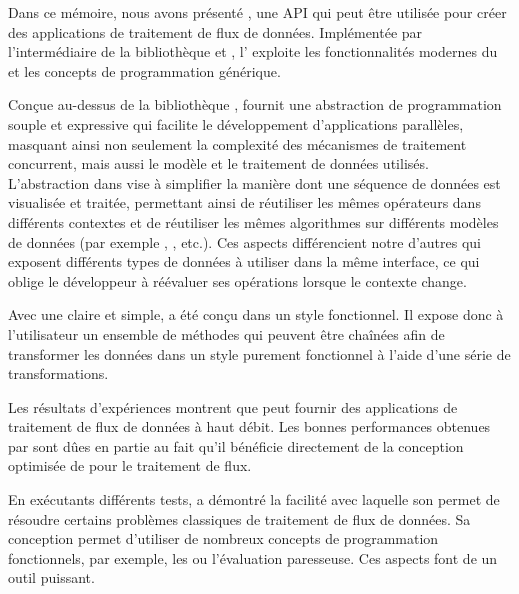 
\begin{conclusion}
\label{conclusion.chap}

Dans ce m\'emoire, nous avons pr\'esent\'e , une API qui peut \^etre utilis\'ee pour cr\'eer des applications de traitement de flux de donn\'ees. Impl\'ement\'ee par l'interm\'ediaire de la biblioth\`eque  et , l' exploite les fonctionnalit\'es modernes du  et les concepts de programmation g\'en\'erique.

Con\c{c}ue au-dessus de la biblioth\`eque ,  fournit une abstraction de programmation souple et expressive qui facilite le d\'eveloppement d'applications parall\`eles, masquant ainsi non seulement la complexit\'e des m\'ecanismes de traitement concurrent, mais aussi le mod\`ele et le traitement de donn\'ees utilis\'es. L'abstraction dans  vise \`a simplifier la mani\`ere dont une s\'equence de donn\'ees est visualis\'ee et trait\'ee, permettant ainsi de r\'eutiliser les m\^emes op\'erateurs dans diff\'erents contextes et de r\'eutiliser les m\^emes algorithmes sur diff\'erents mod\`eles de donn\'ees (par exemple , ,  etc.). Ces aspects diff\'erencient notre  d'autres  qui exposent diff\'erents types de donn\'ees \`a utiliser dans la m\^eme interface, ce qui oblige le d\'eveloppeur \`a r\'e\'evaluer ses op\'erations lorsque le contexte change.

Avec une  claire et simple,  a \'et\'e con\c{c}u dans un style fonctionnel. Il expose donc \`a l'utilisateur un ensemble de m\'ethodes qui peuvent \^etre cha\^in\'ees afin de transformer les donn\'ees dans un style purement fonctionnel \`a l'aide d'une s\'erie de transformations.


Les r\'esultats d'exp\'eriences montrent que  peut fournir des applications de traitement de flux de donn\'ees \`a haut d\'ebit. Les bonnes performances obtenues par  sont d\^ues en partie au fait qu'il b\'en\'eficie directement de la conception optimis\'ee de  pour le traitement de flux.

En ex\'ecutants diff\'erents tests,  a d\'emontr\'e la facilit\'e avec laquelle son  permet de r\'esoudre certains probl\`emes classiques de traitement de flux de donn\'ees. Sa conception permet d'utiliser de nombreux concepts de programmation fonctionnels, par exemple, les  ou l'\'evaluation paresseuse. Ces aspects font de  un outil puissant.


\end{conclusion}

